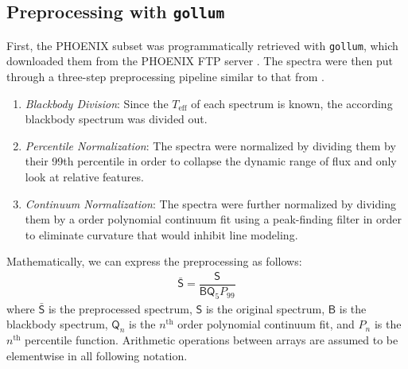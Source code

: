 \documentclass[twocolumn, linenumbers]{aastex631}
\begin{document}
\subsection{Preprocessing with \texttt{gollum}}
First, the PHOENIX subset was programmatically retrieved with \texttt{gollum}, which downloaded them from the PHOENIX FTP server \citep{gollum}. The spectra were then put through a 
three-step preprocessing pipeline similar to that from \citealt{blase}.
\begin{enumerate}
    \item \textit{Blackbody Division}: Since the $T_{\mathrm{eff}}$ of each spectrum is known, the according blackbody spectrum was divided out.
    \item \textit{Percentile Normalization}: The spectra were normalized by dividing them by their 99th percentile in order to collapse the dynamic range of flux and only look at relative features.
    \item \textit{Continuum Normalization}: The spectra were further normalized by dividing them by a  order polynomial continuum fit using a peak-finding filter in order to eliminate curvature that would inhibit line modeling.
\end{enumerate}
Mathematically, we can express the preprocessing as follows:
\begin{gather}
    \mathsf{\bar{S}} = \dfrac{\mathsf{S}}{\mathsf{B}\mathsf{Q}_5P_{99}}
\end{gather}
where $\mathsf{\bar{S}}$ is the preprocessed spectrum, $\mathsf{S}$ is the original spectrum,  $\mathsf{B}$ is the blackbody spectrum, $\mathsf{Q}_n$ is the $n^\mathrm{th}$ order polynomial continuum fit, and $P_n$ is the $n^\mathrm{th}$ percentile function. 
Arithmetic operations between arrays are assumed to be elementwise in all following notation.
\end{document}
